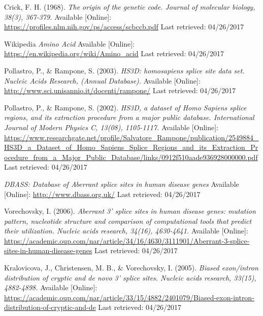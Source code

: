\documentclass[12pt,a4paper]{article}
\begin{document}
	
	\begin{thebibliography}{9}
		
		Crick, F. H. (1968).
		\textit{The origin of the genetic code. Journal of molecular biology, 38(3), 367-379.}
		Available [Online]: \url{https://profiles.nlm.nih.gov/ps/access/scbccb.pdf}
		Last retrieved: 04/26/2017
		
		Wikipedia
		\textit{Amino Acid}
		Available [Online]: \url{https://en.wikipedia.org/wiki/Amino_acid}
		Last retrieved: 04/26/2017

		Pollastro, P., \& Rampone, S. (2003).
		\textit{ HS3D: homosapiens splice site data set. Nucleic Acids Research, (Annual Database).}
		Available [Online]: \url{ http://www.sci.unisannio.it/docenti/rampone/}
		Last retrieved: 04/26/2017

		Pollastro, P., \& Rampone, S. (2002).
		\textit{ HS3D, a dataset of Homo Sapiens splice regions, and its extraction procedure from a major public database. International Journal of Modern Physics C, 13(08), 1105-1117.}
		Available [Online]: \url{https://www.researchgate.net/profile/Salvatore_Rampone/publication/2549884_HS3D_a_Dataset_of_Homo_Sapiens_Splice_Regions_and_its_Extraction_Procedure_from_a_Major_Public_Database/links/0912f510aade936928000000.pdf}
		Last retrieved: 04/26/2017

		\textit{DBASS: Database of Aberrant splice sites in human disease genes}
		Available [Online]: \url{http://www.dbass.org.uk/}
		Last retrieved: 04/26/2017

		Vorechovsky, I. (2006).
		\textit{Aberrant 3' splice sites in human disease genes: mutation pattern, nucleotide structure and comparison of computational tools that predict their utilization. Nucleic acids research, 34(16), 4630-4641.}
		Available [Online]: \url{https://academic.oup.com/nar/article/34/16/4630/3111901/Aberrant-3-splice-sites-in-human-disease-genes}
		Last retrieved: 04/26/2017

		Kralovicova, J., Christensen, M. B., \& Vorechovsky, I. (2005).
		\textit{ Biased exon/intron distribution of cryptic and de novo 3' splice sites. Nucleic acids research, 33(15), 4882-4898.}
		Available [Online]: \url{https://academic.oup.com/nar/article/33/15/4882/2401079/Biased-exon-intron-distribution-of-cryptic-and-de}
		Last retrieved: 04/26/2017


\end{thebibliography}
\end{document}
